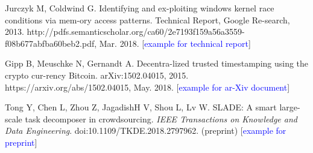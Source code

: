 \documentclass[twoside]{article}
\begin{document}
\begin{multicols}{2}
\begin{thebibliography}{99}
 Jurczyk M, Coldwind G. Identifying and ex-ploiting windows kernel race conditions via mem-ory access patterns. Technical Report, Google Re-search, 2013. http://pdfs.semanticscholar.org/ca60/2e7193f159a56a3559-f08b677abfba60beb2.pdf, Mar. 2018. [\textcolor{blue}{example for technical report}]

 Gipp B, Meuschke N, Gernandt A. Decentra-lized trusted timestamping using the crypto cur-rency Bitcoin. arXiv:1502.04015, 2015. https://arxiv.org/abs/1502.04015, May. 2018. [\textcolor{blue}{example for ar-Xiv document}]

 Tong Y, Chen L, Zhou Z, JagadishH V, Shou L, Lv W. SLADE: A smart large-scale task decomposer in crowdsourcing. {\it IEEE Transactions on Knowledge and Data Engineering}. doi:10.1109/TKDE.2018.2797962. (preprint) [\textcolor{blue}{example for preprint}]

\end{thebibliography}

\label{last-page}
\end{multicols}
\label{last-page}
\end{document}
